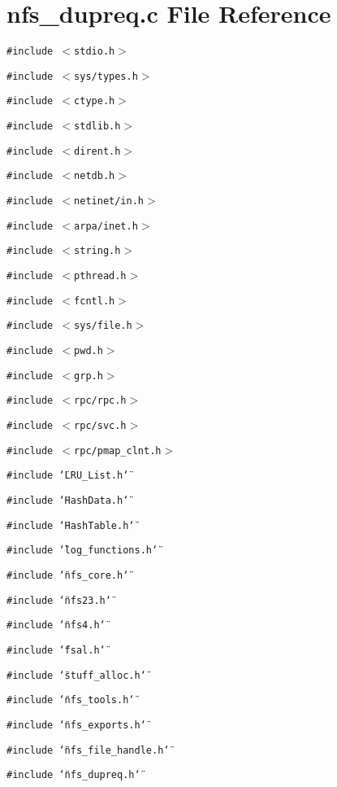 \section{nfs\_\-dupreq.c File Reference}
\label{nfs__dupreq_8c}
{\tt \#include $<$stdio.h$>$}\par
{\tt \#include $<$sys/types.h$>$}\par
{\tt \#include $<$ctype.h$>$}\par
{\tt \#include $<$stdlib.h$>$}\par
{\tt \#include $<$dirent.h$>$}\par
{\tt \#include $<$netdb.h$>$}\par
{\tt \#include $<$netinet/in.h$>$}\par
{\tt \#include $<$arpa/inet.h$>$}\par
{\tt \#include $<$string.h$>$}\par
{\tt \#include $<$pthread.h$>$}\par
{\tt \#include $<$fcntl.h$>$}\par
{\tt \#include $<$sys/file.h$>$}\par
{\tt \#include $<$pwd.h$>$}\par
{\tt \#include $<$grp.h$>$}\par
{\tt \#include $<$rpc/rpc.h$>$}\par
{\tt \#include $<$rpc/svc.h$>$}\par
{\tt \#include $<$rpc/pmap\_\-clnt.h$>$}\par
{\tt \#include \char`\"{}LRU\_\-List.h\char`\"{}}\par
{\tt \#include \char`\"{}Hash\-Data.h\char`\"{}}\par
{\tt \#include \char`\"{}Hash\-Table.h\char`\"{}}\par
{\tt \#include \char`\"{}log\_\-functions.h\char`\"{}}\par
{\tt \#include \char`\"{}nfs\_\-core.h\char`\"{}}\par
{\tt \#include \char`\"{}nfs23.h\char`\"{}}\par
{\tt \#include \char`\"{}nfs4.h\char`\"{}}\par
{\tt \#include \char`\"{}fsal.h\char`\"{}}\par
{\tt \#include \char`\"{}stuff\_\-alloc.h\char`\"{}}\par
{\tt \#include \char`\"{}nfs\_\-tools.h\char`\"{}}\par
{\tt \#include \char`\"{}nfs\_\-exports.h\char`\"{}}\par
{\tt \#include \char`\"{}nfs\_\-file\_\-handle.h\char`\"{}}\par
{\tt \#include \char`\"{}nfs\_\-dupreq.h\char`\"{}}\par
